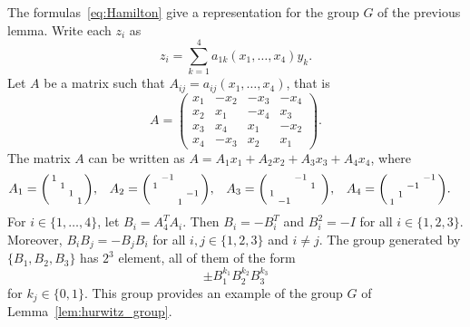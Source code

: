  \begin{example}
 	The formulas~\eqref{eq:Hamilton} give a representation for the
 	group $G$ of the previous lemma. Write each $z_i$ as 
 	\[
    z_i=\sum_{k=1}^4a_{1k}(x_1,\dots,x_4)y_k.
    \]
    Let $A$ be a matrix
 	such that 
 	$A_{ij}=a_{ij}(x_1,\dots,x_4)$, that is 
 	\[
 		A=\begin{pmatrix}
 			x_1 & -x_2 & -x_3 & -x_4\\
 			x_2 & x_1 & -x_4 & x_3\\
 			x_3 & x_4 & x_1 & -x_2\\
 			x_4 & -x_3 & x_2 & x_1
 		\end{pmatrix}.
 	\]
 	The matrix $A$ can be written as $A=A_1x_1+A_2x_2+A_3x_3+A_4x_4$, where
 	\begin{align*}
 		&A_1=\begin{psmallmatrix}
 		1\\
 		&1\\
 		&&1\\
 		&&&1\\
 		\end{psmallmatrix},
 		&&
 		A_2=\begin{psmallmatrix}
 			& -1\\
 			1 \\
 			&&&-1\\
 			&&1
 		\end{psmallmatrix},
 		&&
 		A_3=\begin{psmallmatrix}
 			&& -1 \\
 			&&&1 & \\
 			1\\
 			&-1
 		  \end{psmallmatrix},
 		  &&
 		  A_4=\begin{psmallmatrix}
 			&&&-1\\
 			&&-1\\
 			&1\\
 			1
 		\end{psmallmatrix}.
 	\end{align*}
 	For $i\in\{1,\dots,4\}$, let $B_i=A_4^TA_i$. Then
 	$B_i=-B_i^T$ and  $B_i^2=-I$ 
 	for all $i\in\{1,2,3\}$. Moreover, $B_iB_j=-B_jB_i$ for all $i,j\in\{1,2,3\}$ and
 	$i\ne j$.  
 	The group generated by $\{B_1,B_2,B_3\}$ has $2^3$ element, all of them
 	of the form
 	\[
 		\pm B_1^{k_1}B_2^{k_2}B_3^{k_3}
 	\]
 	for $k_j\in\{0,1\}$. This group provides an example 
    of the group $G$ of Lemma~\ref{lem:hurwitz_group}. 
    
 \end{example}

